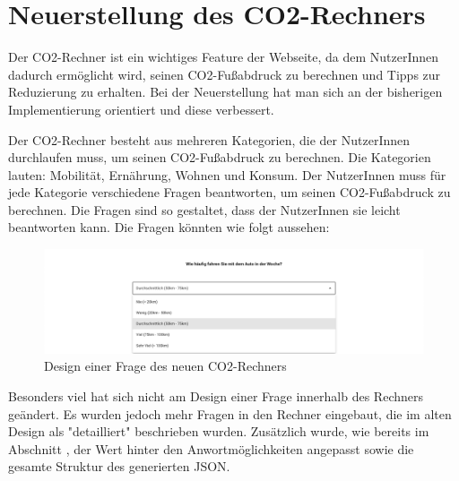 \section{Neuerstellung des CO2-Rechners}


Der CO2-Rechner ist ein wichtiges Feature der Webseite, da dem NutzerInnen dadurch ermöglicht wird, seinen CO2-Fußabdruck zu berechnen und Tipps zur Reduzierung zu erhalten.
Bei der Neuerstellung hat man sich an der bisherigen Implementierung orientiert und diese verbessert.

Der CO2-Rechner besteht aus mehreren Kategorien, die der NutzerInnen durchlaufen muss, um seinen CO2-Fußabdruck zu berechnen.
Die Kategorien lauten: Mobilität, Ernährung, Wohnen und Konsum.
Der NutzerInnen muss für jede Kategorie verschiedene Fragen beantworten, um seinen CO2-Fußabdruck zu berechnen.
Die Fragen sind so gestaltet, dass der NutzerInnen sie leicht beantworten kann.
Die Fragen könnten wie folgt aussehen:

\begin{figure}[H]
    \centering
    \includegraphics[width=1\textwidth]{images/06/Question_New_Design.png}
    \caption{Design einer Frage des neuen CO2-Rechners}
    \label{fig:new-co2runter-question-design}
\end{figure}

Besonders viel hat sich nicht am Design einer Frage innerhalb des Rechners geändert.
Es wurden jedoch mehr Fragen in den Rechner eingebaut, die im alten Design als "detailliert" beschrieben wurden.
Zusätzlich wurde, wie bereits im Abschnitt
, der Wert hinter den Anwortmöglichkeiten angepasst sowie die gesamte Struktur des generierten \acs{JSON}.

